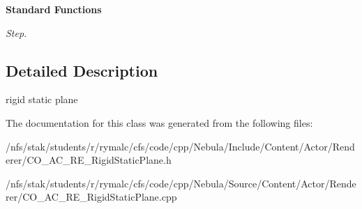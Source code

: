 \begin{Indent}{\bf Standard Functions}
\begin{DoxyCompactItemize}
\begin{DoxyCompactList}\small\item\em Step. \item\end{DoxyCompactList}\end{DoxyCompactItemize}
\end{Indent}


\subsection{Detailed Description}
rigid static plane 

The documentation for this class was generated from the following files:\begin{DoxyCompactItemize}
\item 
/nfs/stak/students/r/rymalc/cfs/code/cpp/Nebula/Include/Content/Actor/Renderer/CO\_\-AC\_\-RE\_\-RigidStaticPlane.h\item 
/nfs/stak/students/r/rymalc/cfs/code/cpp/Nebula/Source/Content/Actor/Renderer/CO\_\-AC\_\-RE\_\-RigidStaticPlane.cpp\end{DoxyCompactItemize}
